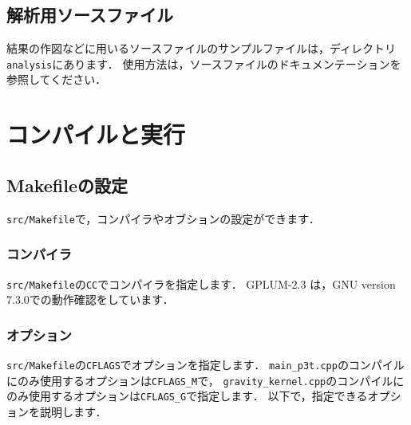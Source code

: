 \documentclass[12pt,a4paper,dvipdfmx]{jsarticle}
\newcommand{\ourcodeR}{GPLUM-2.3\xspace}
\begin{document}
\subsection{解析用ソースファイル}
結果の作図などに用いるソースファイルのサンプルファイルは，ディレクトリ\texttt{analysis}にあります．
使用方法は，ソースファイルのドキュメンテーションを参照してください．



\section{コンパイルと実行}

\subsection{Makefileの設定}

\texttt{src/Makefile}で，コンパイラやオブションの設定ができます．

\subsubsection{コンパイラ}
\texttt{src/Makefile}の\texttt{CC}でコンパイラを指定します．
\ourcodeR は，GNU version 7.3.0での動作確認をしています．

\subsubsection{オプション}
\texttt{src/Makefile}の\texttt{CFLAGS}でオプションを指定します．
\texttt{main\_p3t.cpp}のコンパイルにのみ使用するオプションは\texttt{CFLAGS\_M}で，
\texttt{gravity\_kernel.cpp}のコンパイルにのみ使用するオプションは\texttt{CFLAGS\_G}で指定します．
以下で，指定できるオプションを説明します．
\end{document}
